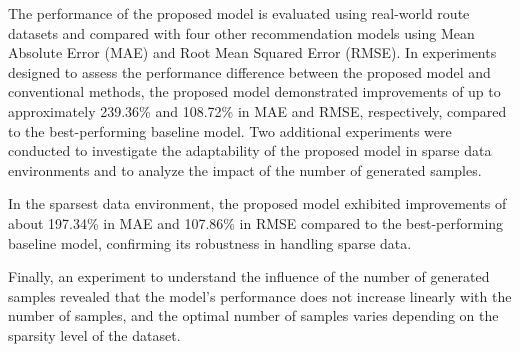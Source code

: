 \documentclass[]{article}
\begin{document}
The performance of the proposed model is evaluated using real-world route datasets and compared with four other recommendation models using Mean Absolute Error (MAE) and Root Mean Squared Error (RMSE). In experiments designed to assess the performance difference between the proposed model and conventional methods, the proposed model demonstrated improvements of up to approximately 239.36\% and 108.72\% in MAE and RMSE, respectively, compared to the best-performing baseline model. Two additional experiments were conducted to investigate the adaptability of the proposed model in sparse data environments and to analyze the impact of the number of generated samples.

In the sparsest data environment, the proposed model exhibited improvements of about 197.34\% in MAE and 107.86\% in RMSE compared to the best-performing baseline model, confirming its robustness in handling sparse data.

Finally, an experiment to understand the influence of the number of generated samples revealed that the model's performance does not increase linearly with the number of samples, and the optimal number of samples varies depending on the sparsity level of the dataset.
\end{document}
